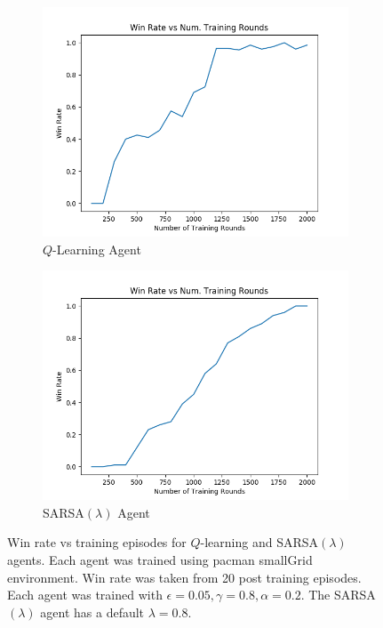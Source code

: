 \documentclass[10pt,conference]{IEEEtran}
\begin{document}
	\begin{figure}[h]
		\centering
		\begin{subfigure}{0.40\textwidth}
			\includegraphics[width=\textwidth]{./images/qlearning_winrate}
			\caption{\(Q\)-Learning Agent}
		\end{subfigure}%
		\begin{subfigure}{0.40\textwidth}
			\includegraphics[width=\textwidth]{./images/sarsa_winrate}
			\caption{SARSA\((\lambda)\) Agent}
		\end{subfigure}
		\caption{Win rate vs training episodes for \(Q\)-learning and
		SARSA\((\lambda)\) agents.  Each agent was trained using 
		pacman smallGrid environment.  Win rate was taken from 
		20 post training episodes. Each agent was trained with 
		\(\epsilon = 0.05, \gamma = 0.8, \alpha = 0.2\).  The 
		SARSA\((\lambda)\) agent has a default \(\lambda = 0.8\).}
		\label{winrate}
	\end{figure}
\end{document}
